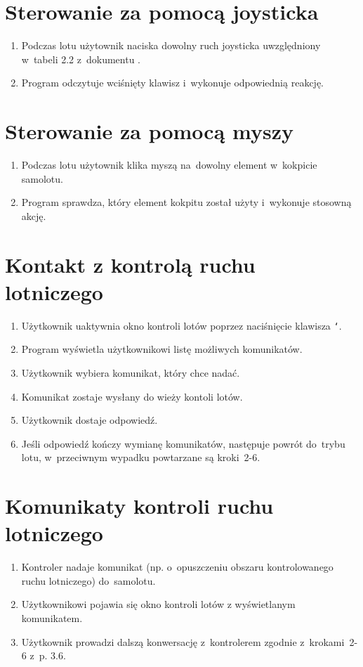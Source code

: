 \documentclass{mwrep}
\begin{document}
\section{Sterowanie za pomocą joysticka}
\begin{enumerate}
  \item Podczas lotu użytownik naciska dowolny ruch joysticka uwzględniony w~tabeli 2.2 z~dokumentu \cite{WYM}.
  \item Program odczytuje wciśnięty klawisz i~wykonuje odpowiednią reakcję.
\end{enumerate}

\section{Sterowanie za pomocą myszy}
\begin{enumerate}
  \item Podczas lotu użytownik klika myszą na~dowolny element w~kokpicie samolotu.
  \item Program sprawdza, który element kokpitu został użyty i~wykonuje stosowną akcję.
\end{enumerate}

\section{Kontakt z kontrolą ruchu lotniczego}
\begin{enumerate}
  \item Użytkownik uaktywnia okno kontroli lotów poprzez naciśnięcie klawisza \texttt{`}.
  \item Program wyświetla użytkownikowi listę możliwych komunikatów.
  \item Użytkownik wybiera komunikat, który chce nadać.
  \item Komunikat zostaje wysłany do wieży kontoli lotów.
  \item Użytkownik dostaje odpowiedź.
  \item Jeśli odpowiedź kończy wymianę komunikatów, następuje powrót do~trybu lotu, w~przeciwnym wypadku powtarzane są kroki~2-6.
\end{enumerate}

\section{Komunikaty kontroli ruchu lotniczego}
\begin{enumerate}
  \item Kontroler nadaje komunikat (np. o~opuszczeniu obszaru kontrolowanego ruchu lotniczego) do~samolotu.
  \item Użytkownikowi pojawia się okno kontroli lotów z wyświetlanym komunikatem.
  \item Użytkownik prowadzi dalszą konwersację z~kontrolerem zgodnie \linebreak z~krokami~2-6 z~p. 3.6.
\end{enumerate}
\end{document}
